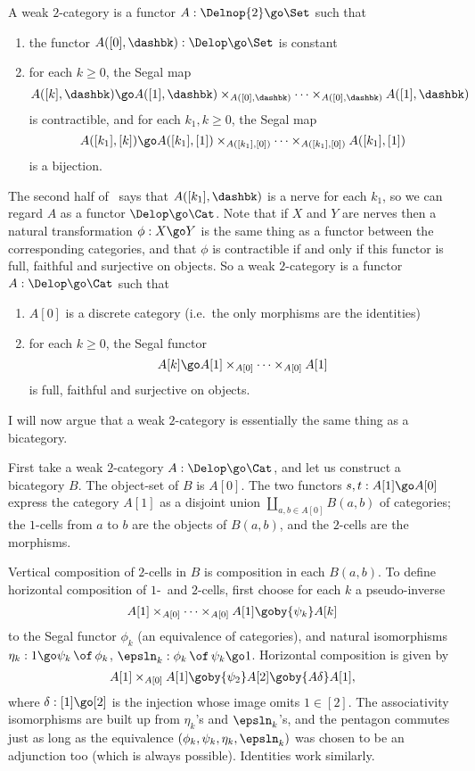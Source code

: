 A weak $2$-category is a
functor $A: \Delnop{2} \go \Set$ such that
%
\begin{enumerate}
\item the functor $A([0],\dashbk): \Delop \go \Set$ is constant
\item for each $k\geq 0$, the Segal map 
\[
A([k], \dashbk) \go 
A([1],\dashbk) \times_{A([0],\dashbk)} \cdots 
\times_{A([0],\dashbk)} A([1],\dashbk)
\]
is contractible, and for each $k_1, k\geq 0$, the Segal map
\[
A([k_1],[k]) \go 
A([k_1],[1]) \times_{A([k_1],[0])} \cdots 
\times_{A([k_1],[0])} A([k_1],[1])
\]
is a bijection.
\end{enumerate}
%
The second half of~ says that $A([k_1],\dashbk)$ is a
nerve for each $k_1$, so we can regard $A$ as a functor $\Delop \go \Cat$.
Note that if $X$ and $Y$ are nerves then a natural transformation $\phi: X
\go Y$ is the same thing as a functor between the corresponding categories,
and that $\phi$ is contractible if and only if this functor is full, faithful
and surjective on objects.  So a weak $2$-category is a functor $A: \Delop
\go \Cat$ such that
%
\begin{enumerate}
\item $A[0]$ is a discrete category (i.e.\ the only morphisms are the
identities) 
\item for each $k\geq 0$, the Segal functor 
\[
A[k] \go A[1] \times_{A[0]} \cdots \times_{A[0]} A[1]
\]
is full, faithful and surjective on objects.  
\end{enumerate}

I will now argue that a weak $2$-category is essentially the same thing as a
bicategory.

First take a weak $2$-category $A: \Delop \go \Cat$, and let us construct a
bicategory $B$.  The object-set of $B$ is $A[0]$.  The two functors
$s,t: A[1] \go A[0]$ express the category $A[1]$ as a disjoint union
$\coprod_{a,b\in A[0]}B(a,b)$ of categories; the $1$-cells from $a$ to $b$
are the objects of $B(a,b)$, and the $2$-cells are the morphisms.

Vertical composition of $2$-cells in $B$ is composition in each
$B(a,b)$.  To define horizontal composition of $1$-~and $2$-cells,
first choose for each $k$ a pseudo-inverse
\[
A[1] \times_{A[0]} \cdots \times_{A[0]} A[1] \goby{\psi_k} A[k]
\]
to the Segal functor $\phi_k$ (an equivalence of categories), and
natural isomorphisms $\eta_k: 1 \go \psi_k\,\of\,\phi_k$, $\epsln_k:
\phi_k\,\of\,\psi_k \go 1$.  Horizontal composition is given by
\[
A[1] \times_{A[0]} A[1] \goby{\psi_2} A[2] \goby{A\delta} A[1],
\]
where $\delta:[1] \go [2]$ is the injection whose image omits $1\in [2]$.
The associativity isomorphisms are built up from $\eta_k$'s and $\epsln_k$'s,
and the pentagon commutes just as long as the equivalence
$(\phi_k,\psi_k,\eta_k,\epsln_k)$ was chosen to be an adjunction too (which
is always possible).  Identities work similarly.

